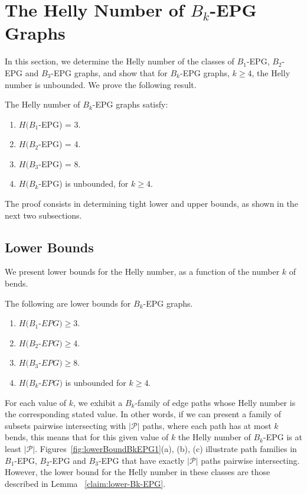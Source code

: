 \section{The Helly Number of $B_k$-EPG Graphs}\label{sec:Helly-number}

In this section, we determine the Helly number of the classes of $B_1$-EPG, $B_2$-EPG and $B_3$-EPG graphs, and show that for $B_k$-EPG graphs, $k \geq 4$, the Helly number is unbounded. We prove the following result.

\begin{theorem}\label{thm:Helly-EPG}
The Helly number of $B_k$-EPG graphs satisfy:
\begin{enumerate}[nosep,label=\emph{(\roman*)}]
\item  $H(B_1$-EPG) = 3.
\item $H(B_2$-EPG)  = 4. 
\item $H(B_3$-EPG)  = 8. 
\item $H(B_k$-EPG) is unbounded, for 
$k \geq 4$.
\end{enumerate}

\end{theorem}

The proof consists in determining tight lower and upper bounds, as shown in the next two subsections. 

\subsection{Lower Bounds}

We present lower bounds for the Helly number, as a function of the number $k$ of bends.

\begin{claim}\label{claim:lower-Bk-EPG} 
The following are lower bounds for $B_k$-EPG graphs.
\begin{enumerate}[nosep,label=\emph{(\roman*)}]
\item   $H(B_1$-$EPG) \geq 3$. 
\item $H(B_2$-$EPG) \geq 4$. 
\item $H(B_3$-$EPG) \geq 8$. 
\item $H(B_k$-$EPG )$ is unbounded for $k \geq 4$.
\end{enumerate}
\end{claim}

For each value of $k$, we exhibit a $B_k$-family of edge paths whose Helly number is the corresponding stated value. In other words, if we can present a family of subsets pairwise intersecting  with $|\mathcal{P}|$ paths, where each path has at most $k$ bends, this means that for this given value of $ k $ the Helly number of $B_k$-EPG is at least $ |\mathcal{P}|$. Figures~\ref{fig:lowerBoundBkEPG1}(a), (b), (c) illustrate path families in $B_1$-EPG, $B_2$-EPG and $B_3$-EPG that have exactly $ |\mathcal{P}|$ paths pairwise intersecting. However, the lower bound for the Helly number in these classes are those described in Lemma
~\ref{claim:lower-Bk-EPG}.


